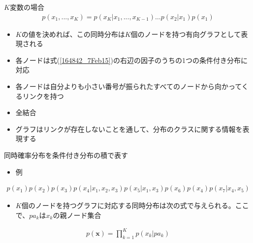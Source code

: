\begin{frame}{$K$変数の場合}
 \begin{eqnarray}
  p(x_1,...,x_K) = p(x_K|x_1,...,x_{K-1})\dots p(x_2|x_1)p(x_1)\label{164842_7Feb15}
 \end{eqnarray}
 \begin{itemize}
  \item $K$の値を決めれば、この同時分布は$K$個のノードを持つ有向グラフとして表現される
  \item 各ノードは式(\ref{164842_7Feb15})の右辺の因子のうちの1つの条件付き分布に対応
  \item 各ノードは自分よりも小さい番号が振られたすべてのノードから向かってくるリンクを持つ
  \item 全結合
  \item グラフはリンクが存在しないことを通して、分布のクラスに関する情報を表現する
 \end{itemize}
\end{frame}

\begin{frame}{同時確率分布を条件付き分布の積で表す}
 \begin{itemize}
  \item 例
 \end{itemize}
 \begin{eqnarray*}
  p(x_1)p(x_2)p(x_3)p(x_4|x_1,x_2,x_3)p(x_5|x_1,x_3)p(x_6)p(x_4)p(x_7|x_4,x_5)
 \end{eqnarray*}
 \begin{itemize}
  \item $K$個のノードを持つグラフに対応する同時分布は次の式で与えられる。ここで、$pa_k$は$x_k$の親ノード集合
 \end{itemize}
 \begin{eqnarray*}
  p(\bm{x}) = \prod_{k=1}^{K}p(x_k|pa_k)
 \end{eqnarray*}
\end{frame}

